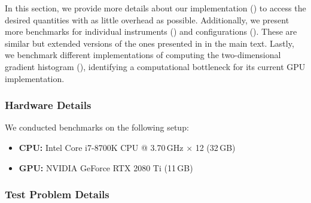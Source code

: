 In this section, we provide more details about our implementation
() to access the desired quantities with as
little overhead as possible. Additionally, we present more benchmarks for
individual instruments () and \cockpit
configurations (). These are similar
but extended versions of the ones presented in
 in the
main text. Lastly, we benchmark different implementations of computing the
two-dimensional gradient histogram (), identifying
a computational bottleneck for its current GPU implementation.

\subsubsection{Hardware Details}

We conducted benchmarks on the following setup:
\begin{itemize}
\item \textbf{CPU:} Intel Core i7-8700K CPU @ 3.70\,GHz × 12 (32\,GB)
\item \textbf{GPU:} NVIDIA GeForce RTX 2080 Ti (11\,GB)
\end{itemize}

\subsubsection{Test Problem Details}

